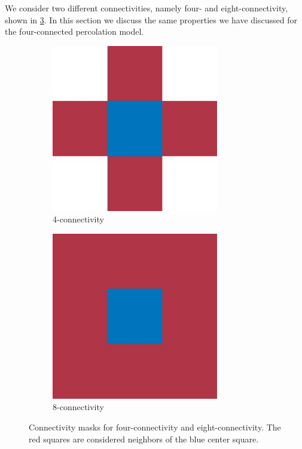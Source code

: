 We consider two different connectivities, namely four- and eight-connectivity, shown in \cref{fig:exp:connectivity}. In this section we discuss the same properties we have discussed for the four-connected percolation model.\\

\begin{figure}
	\centering
	\begin{subfigure}{0.45\columnwidth}
		\centering
		\includegraphics[width=0.8\textwidth]{./img/exp_mask_four.jpg}
		\caption{4-connectivity}
		\label{fig:exp:connectivity:fourMask}
	\end{subfigure}
	\begin{subfigure}{0.45\columnwidth}
		\centering
		\includegraphics[width=0.8\textwidth]{./img/exp_mask_eight.jpg}
		\caption{8-connectivity}
		\label{fig:exp:connectivity:eightMask}
	\end{subfigure}	
	\caption{Connectivity masks for  four-connectivity and  eight-connectivity. The red squares are considered neighbors of the blue center square.}
	\label{fig:exp:connectivity}
\end{figure}

